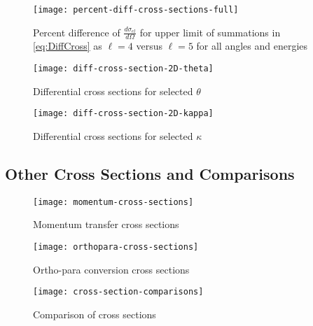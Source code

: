 \documentclass[Dissertation.tex]{subfiles}
\begin{document}
\begin{figure}[H]
	\centering
	\texttt{[image: percent-diff-cross-sections-full]}
	\caption[Percent difference of differential cross sections at all angles]{Percent difference of $\frac{d\sigma_{el}}{d\Omega}$ for upper limit of summations in \ref{eq:DiffCross} as $\ell = 4$ versus $\ell = 5$ for all angles and energies}
	\label{fig:percent-diff-cross-sections-full}
\end{figure}

\begin{figure}[H]
	\centering
	\texttt{[image: diff-cross-section-2D-theta]}
	\caption{Differential cross sections for selected $\theta$}
	\label{fig:diff-cross-section-2D-theta}
\end{figure}

\begin{figure}[H]
	\centering
	\texttt{[image: diff-cross-section-2D-kappa]}
	\caption{Differential cross sections for selected $\kappa$}
	\label{fig:diff-cross-section-2D-kappa}
\end{figure}


\subsection{Other Cross Sections and Comparisons}
\label{sec:OtherCross}

\begin{figure}[H]
	\centering
	\texttt{[image: momentum-cross-sections]}
	\caption{Momentum transfer cross sections}
	\label{fig:momentum-cross-sections}
\end{figure}

\begin{figure}[H]
	\centering
	\texttt{[image: orthopara-cross-sections]}
	\caption{Ortho-para conversion cross sections}
	\label{fig:orthopara-cross-sections}
\end{figure}

\begin{figure}[H]
	\centering
	\texttt{[image: cross-section-comparisons]}
	\caption{Comparison of cross sections}
	\label{fig:cross-section-comparisons}
\end{figure}
\end{document}
